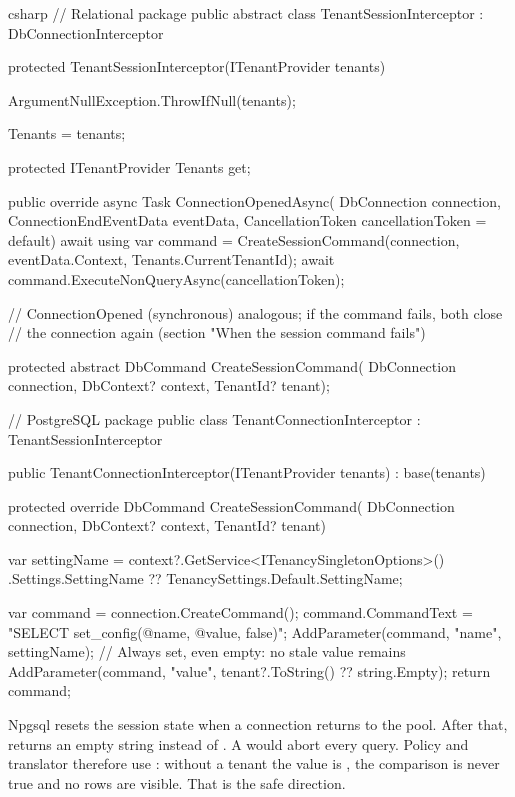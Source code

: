 \begin{sourcecode}{csharp}
// Relational package
public abstract class TenantSessionInterceptor : DbConnectionInterceptor
{
    protected TenantSessionInterceptor(ITenantProvider tenants)
    {
        ArgumentNullException.ThrowIfNull(tenants);

        Tenants = tenants;
    }

    protected ITenantProvider Tenants { get; }

    public override async Task ConnectionOpenedAsync(
        DbConnection connection, ConnectionEndEventData eventData,
        CancellationToken cancellationToken = default)
    {
        await using var command =
            CreateSessionCommand(connection, eventData.Context, Tenants.CurrentTenantId);
        await command.ExecuteNonQueryAsync(cancellationToken);
    }

    // ConnectionOpened (synchronous) analogous; if the command fails, both close
    // the connection again (section "When the session command fails")

    protected abstract DbCommand CreateSessionCommand(
        DbConnection connection, DbContext? context, TenantId? tenant);
}

// PostgreSQL package
public class TenantConnectionInterceptor : TenantSessionInterceptor
{
    public TenantConnectionInterceptor(ITenantProvider tenants)
        : base(tenants)
    {
    }

    protected override DbCommand CreateSessionCommand(
        DbConnection connection, DbContext? context, TenantId? tenant)
    {
        var settingName = context?.GetService<ITenancySingletonOptions>()
                              .Settings.SettingName
                          ?? TenancySettings.Default.SettingName;

        var command = connection.CreateCommand();
        command.CommandText = "SELECT set_config(@name, @value, false)";
        AddParameter(command, "name", settingName);
        // Always set, even empty: no stale value remains
        AddParameter(command, "value", tenant?.ToString() ?? string.Empty);
        return command;
    }
}
\end{sourcecode}

\begin{note}
  Npgsql resets the session state when a connection returns to the pool. After that,
   returns an empty string instead of . A  would abort every
  query. Policy and translator therefore use
  :
  without a tenant the value is , the comparison is never true and no rows are
  visible. That is the safe direction.
\end{note}

